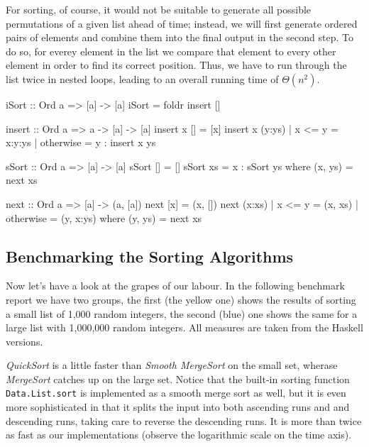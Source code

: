 For sorting, of course, it would not be suitable to generate all possible permutations of a given list ahead of time; instead, we will first generate ordered pairs of elements and combine them into the final output in the second step.
To do so, for everey element in the list we compare that element to every other element in order to find its correct position.
Thus, we have to run through the list twice in nested loops, leading to an overall running time of $\Theta (n^2)$.

\begin{impl}
\end{impl}

\begin{haskellcode}
iSort :: Ord a => [a] -> [a]
iSort = foldr insert []

insert :: Ord a => a -> [a] -> [a]
insert x [] = [x]
insert x (y:ys) | x <= y = x:y:ys
                | otherwise = y : insert x ys
\end{haskellcode}

\begin{impl}
\end{impl}

\begin{haskellcode}
sSort :: Ord a => [a] -> [a]
sSort [] = []
sSort xs = x : sSort ys where (x, ys) = next xs

next :: Ord a => [a] -> (a, [a])
next [x] = (x, [])
next (x:xs) | x <= y = (x, xs)
            | otherwise = (y, x:ys)
            where (y, ys) = next xs
\end{haskellcode}

\subsection{Benchmarking the Sorting Algorithms}

Now let's have a look at the grapes of our labour.
In the following benchmark report we have two groups, the first (the yellow one) shows the results of sorting a small list of 1,000 random integers, the second (blue) one shows the same for a large list with 1,000,000 random integers. All measures are taken from the Haskell versions.

\emph{QuickSort} is a little faster than \emph{Smooth MergeSort} on the small set, wherase \emph{MergeSort} catches up on the large set.
Notice that the built-in sorting function \texttt{Data.List.sort} is implemented as a smooth merge sort as well, but it is even more sophisticated in that it splits the input into both ascending runs and and descending runs, taking care to reverse the descending runs.
It is more than twice as fast as our implementations (observe the logarithmic scale on the time axis). 

